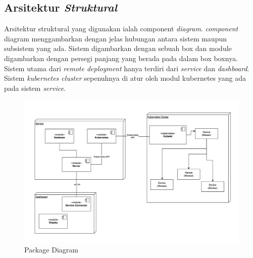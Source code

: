 \subsection{Arsitektur \textit{Struktural}}
\label{subsec:arsitektur-struktural}

Arsitektur struktural yang digunakan ialah component \textit{diagram}. \textit{component} diagram menggambarkan dengan jelas hubungan antara sistem maupun subsistem yang ada. Sistem digambarkan dengan sebuah box dan module digambarkan dengan persegi panjang yang berada pada dalam box boxnya. Sistem utama dari \textit{remote deployment} hanya terdiri dari \textit{service} dan \textit{dashboard}. Sistem \textit{kubernetes cluster} sepenuhnya di atur oleh modul kubernetes yang ada pada sistem \textit{service}.

\begin{figure}[ht]
  \centering
  \includegraphics[width=1\textwidth]{resources/chapter-3/package-diagram.jpg}
  \caption{Package Diagram}
  \label{fig:package-diagram}
\end{figure}

